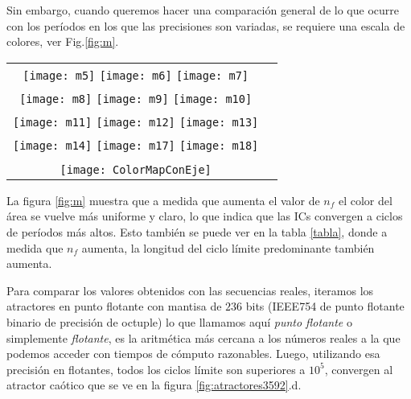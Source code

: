 Sin embargo, cuando queremos hacer una comparación general de lo que ocurre con los períodos en los que las precisiones son variadas, se requiere una escala de colores, ver Fig.\ref{fig:m}.
%
\begin{figure*}
	\centering
	\begin{tabular}{cc}
		\texttt{[image: m5]}
		\texttt{[image: m6]}
		\texttt{[image: m7]}\\
		\texttt{[image: m8]}
		\texttt{[image: m9]}
		\texttt{[image: m10]}\\
		\texttt{[image: m11]}
		\texttt{[image: m12]}
		\texttt{[image: m13]}\\
		\texttt{[image: m14]}
		\texttt{[image: m17]}
		\texttt{[image: m18]}\\
		\\   
		\texttt{[image: ColorMapConEje]}
	\end{tabular}
	\caption{Evolución de las longitudes de período de los dominios de atracción para: (a) $n_f=5$, (b) $n_f=6$, (c) $n_f=7$, (d) $n_f=8$, (e) $n_f=9$, (f) $n_f=10$, (g) $n_f=11$, (h) $n_f=12$, (i) $n_f=13$, (j) $n_f=14$, (k) $n_f=17$, (l) $n_f=18$.}
	\label{fig:m}
\end{figure*}

La figura \ref{fig:m} muestra que a medida que aumenta el valor de $n_f$ el color del área se vuelve más uniforme y claro, lo que indica que las ICs convergen a ciclos de períodos más altos.
Esto también se puede ver en la tabla \ref{tabla}, donde a medida que $n_f$ aumenta, la longitud del ciclo límite predominante también aumenta.

Para comparar los valores obtenidos con las secuencias reales, iteramos los atractores en punto flotante con mantisa de $236$ bits (IEEE754 de punto flotante binario de precisión de octuple) lo que llamamos aquí \textit{punto flotante} o simplemente \textit{flotante}, es la aritmética más cercana a los números reales a la que podemos acceder con tiempos de cómputo razonables.
Luego, utilizando esa precisión en flotantes, todos los ciclos límite son superiores a $10 ^ 5$, convergen al atractor caótico que se ve en la figura \ref{fig:atractores3592}.d.

